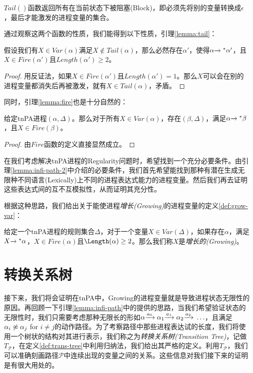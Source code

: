$Tail()$函数返回所有在当前状态下被阻塞(Block)，即必须先将别的变量转换成$\epsilon$，最后才能激发的进程变量的集合。

通过观察这两个函数的性质，我们能得到以下性质，引理\ref{lemma:tail}：

\begin{lem}\label{lemma:tail}
假设我们有$X\in Var(\alpha)$满足$X\notin Tail(\alpha)$，那么必然存在$\alpha'$，使得$\alpha{\xrightarrow{}{}}^{*}\alpha'$，且$X\in Fire(\alpha')$且$Length(\alpha')\geq 2$。
\end{lem}

\begin{proof}
用反证法，如果$X\in Fire(\alpha')$且$Length(\alpha')=1$。那么$X$可以会在别的进程变量都消失后再被激发，就有$X\in Tail(\alpha)$，矛盾。
\end{proof}

同时，引理\ref{lemma:fire}也是十分自然的：

\begin{lem}\label{lemma:fire}
给定tnPA进程$(\alpha,\Delta)$。那么对于所有$X\in Var(\alpha)$，存在$(\beta,\Delta)$，满足$\alpha{\xrightarrow{}{}}^{*}\beta$，且$X\in Fire(\beta)$。
\end{lem}

\begin{proof}
由$Fire$函数的定义直接显然成立。
\end{proof}

在我们考虑解决tnPA进程的Regularity问题时，希望找到一个充分必要条件。由引理\ref{lemma:infi-path-2}中介绍的必要条件，我们首先希望能找到那种有潜在生成无限种不同语言(Lexically)上不同的进程表达式能力的进程变量。然后我们再去证明这些表达式间的互不互模拟性，从而证明其充分性。

根据这种思路，我们给出关于能使进程\emph{增长(Growing)}的进程变量的定义\ref{def:grow-var}：

\begin{defn}\label{def:grow-var}
给定一个tnPA进程的规则集合$\Delta$，对于一个变量$X\in Var(\Delta)$，如果存在$\alpha$，满足$X{\xrightarrow{}{}}^{*}\alpha$，$X\in Fire(\alpha)$且$\Length(\alpha)\geq 2$。那么我们称$X$是\emph{增长的(Growing)}。
\end{defn}

\section{转换关系树}
\label{sec:trans-tree}

接下来，我们将会证明在tnPA中，Growing的进程变量就是导致进程状态无限性的原因。再回顾一下引理\ref{lemma:infi-path}中的提供的思路，当我们希望验证状态的无限性时，我们只需要考虑那种无限长的形如$\alpha{\xrightarrow{a_0}{}}\alpha_1{\xrightarrow{a_1}{}}\alpha_2{\xrightarrow{a_2}{}}\ldots$，且满足$\alpha_i\not\approx \alpha_j$ for $i\neq j$的动作路径。为了考察路径中那些进程表达试的长度，我们将使用一个树状的结构对其进行表示，我们称之为\emph{转换关系树(Transition Tree)}，记做$T_{\mathcal{P}}$，在定义\ref{def:trans-tree}中利用归纳法，我们给出其严格的定义。利用$T_{\mathcal{P}}$，我们可以准确刻画路径$\mathcal{P}$中连续出现的变量之间的关系。这些信息对我们接下来的证明是有很大用处的。

